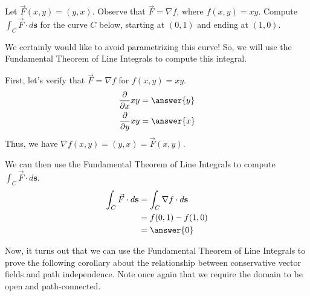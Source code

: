 \documentclass{ximera}
\begin{document}
\begin{example}
Let $\vec{F}(x,y)=(y,x)$. Observe that $\vec{F}=\nabla f$, where $f(x,y)=xy$. Compute $\int_C\vec{F}\cdot d\textbf{s}$ for the curve $C$ below, starting at $(0,1)$ and ending at $(1,0)$.
\begin{center}
\end{center}
\begin{explanation}
We certainly would like to avoid parametrizing this curve! So, we will use the Fundamental Theorem of Line Integrals to compute this integral.

First, let's verify that $\vec{F}=\nabla f$ for $f(x,y)=xy$.
\begin{align*}
\frac{\partial}{\partial x}xy &= \answer{y}\\
\frac{\partial}{\partial y}xy &= \answer{x}
\end{align*}
Thus, we have $\nabla f(x,y)= (y,x) = \vec{F}(x,y)$.

We can then use the Fundamental Theorem of Line Integrals to compute $\int_C\vec{F}\cdot d\textbf{s}$.
\begin{align*}
\int_C\vec{F}\cdot d\textbf{s} &= \int_C\nabla f\cdot d\textbf{s}\\
&= f(0,1) - f(1,0)\\
&= \answer{0}
\end{align*}

\end{explanation}
\end{example}

Now, it turns out that we can use the Fundamental Theorem of Line Integrals to prove the following corollary about the relationship between conservative vector fields and path independence. Note once again that we require the domain to be open and path-connected.
\end{document}
